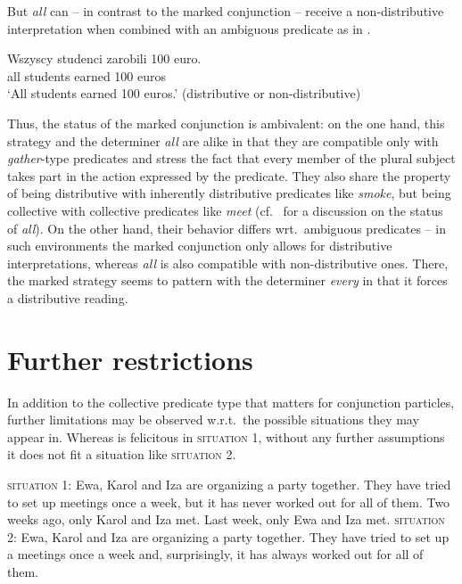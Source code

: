 \documentclass[output=paper]{langscibook}
\begin{document}
\z

\noindent But \textit{all} can -- in contrast to the marked conjunction -- receive a non-distributive interpretation when combined with an ambiguous predicate as in .

\ea\label{ros:all3} \gll Wszyscy studenci zarobili 100 euro. \\
all students earned 100 euros \\
\glt `All students earned 100 euros.' (distributive or non-distributive) 
\z


\noindent Thus, the status of the marked conjunction is ambivalent: on the one hand, this strategy and the determiner \textit{all} are alike in that they are compatible only with \textit{gather}-type predicates and stress the fact that every member of the plural subject takes part in the action expressed by the predicate. They also share the property of being distributive with inherently distributive predicates like \textit{smoke}, but being collective with collective predicates like \textit{meet} (cf.~\citealt{Dowty:1987} for a discussion on the status of \textit{all}). On the other hand, their behavior differs wrt.~ambiguous predicates -- in such environments the marked conjunction only allows for distributive interpretations, whereas \textit{all} is also compatible with non-distributive ones. There, the marked strategy seems to pattern with the determiner \textit{every} in that it forces a distributive reading. 


\section{Further restrictions}\label{ros:sec:4}

In addition to the collective predicate type that matters for conjunction particles, further limitations may be observed w.r.t.~the possible situations they may appear in. Whereas  is felicitous in \textsc{situation 1}, without any further assumptions it does not fit a situation like \textsc{situation 2}.

\eanoraggedright
\eanoraggedright\label{ros:c1} \textsc{situation 1:} Ewa, Karol and Iza are organizing a party together. They have tried to set up meetings once a week, but it has never worked out for all of them. Two weeks ago, only Karol and Iza met. Last week, only Ewa and Iza met.
\ex \textsc{situation 2:} Ewa, Karol and Iza are organizing a party together. They have tried to set up a meetings once a week and, surprisingly, it has always worked out for all of them.
\z\z
\end{document}
